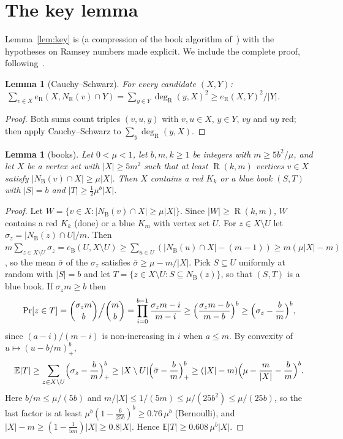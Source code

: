\documentclass[11pt]{article}
\newtheorem{lemma}[theorem]{Lemma}
\theoremstyle{definition}
\newcommand{\eR}{e_{\mathrm R}}
\newcommand{\NR}{N_{\mathrm R}}
\newcommand{\NB}{N_{\mathrm B}}
\DeclareMathOperator{\Ram}{R}
\begin{document}
\section{The key lemma}\label{sec:key}

Lemma~\ref{lem:key} is \cite[Lemma~12]{GNNW} (a compression of the book algorithm of~\cite{CGMS}) with the hypotheses on Ramsey numbers made explicit.  We include the complete proof, following~\cite{GNNW}.

\begin{lemma}[Cauchy--Schwarz]\label{lem:cs}
For every candidate $(X,Y)$: $\ \sum_{v\in X}\eR(X,\NR(v)\cap Y)=\sum_{y\in Y}\deg_{\mathrm R}(y,X)^2\ge\eR(X,Y)^2/|Y|$.
\end{lemma}
\begin{proof}
Both sums count triples $(v,u,y)$ with $v,u\in X$, $y\in Y$, $vy$ and $uy$ red; then apply Cauchy--Schwarz to $\sum_y\deg_{\mathrm R}(y,X)$.
\end{proof}

\begin{lemma}[books]\label{lem:book}
Let $0<\mu<1$, let $b,m,k\ge1$ be integers with $m\ge5b^2/\mu$, and let $X$ be a vertex set with $|X|\ge5m^2$ such that at least $\Ram(k,m)$ vertices $v\in X$ satisfy $|\NB(v)\cap X|\ge\mu|X|$.  Then $X$ contains a red $K_k$ or a blue book $(S,T)$ with $|S|=b$ and $|T|\ge\frac12\mu^b|X|$.
\end{lemma}
\begin{proof}
Let $W=\{v\in X:|\NB(v)\cap X|\ge\mu|X|\}$.  Since $|W|\ge\Ram(k,m)$, $W$ contains a red $K_k$ (done) or a blue $K_m$ with vertex set $U$.  For $z\in X\setminus U$ let $\sigma_z=|\NB(z)\cap U|/m$.  Then
$m\sum_{z\in X\setminus U}\sigma_z=e_{\mathrm B}(U,X\setminus U)\ge\sum_{u\in U}(|\NB(u)\cap X|-(m-1))\ge m(\mu|X|-m)$,
so the mean $\bar\sigma$ of the $\sigma_z$ satisfies $\bar\sigma\ge\mu-m/|X|$.  Pick $S\subseteq U$ uniformly at random with $|S|=b$ and let $T=\{z\in X\setminus U:S\subseteq\NB(z)\}$, so that $(S,T)$ is a blue book.  If $\sigma_zm\ge b$ then
\[
\Pr[z\in T]=\binom{\sigma_zm}{b}\Big/\binom mb=\prod_{i=0}^{b-1}\frac{\sigma_zm-i}{m-i}\ge\Bigl(\frac{\sigma_zm-b}{m-b}\Bigr)^b\ge\Bigl(\sigma_z-\frac bm\Bigr)^b,
\]
since $(a-i)/(m-i)$ is non-increasing in $i$ when $a\le m$.  By convexity of $u\mapsto(u-b/m)_+^b$,
\[
\mathbb E|T|\ge\sum_{z\in X\setminus U}\Bigl(\sigma_z-\frac bm\Bigr)_+^b\ge|X\setminus U|\Bigl(\bar\sigma-\frac bm\Bigr)_+^b\ge(|X|-m)\Bigl(\mu-\frac m{|X|}-\frac bm\Bigr)^b .
\]
Here $b/m\le\mu/(5b)$ and $m/|X|\le1/(5m)\le\mu/(25b^2)\le\mu/(25b)$, so the last factor is at least $\mu^b(1-\frac6{25b})^b\ge0.76\,\mu^b$ (Bernoulli), and $|X|-m\ge(1-\frac1{5m})|X|\ge0.8|X|$.  Hence $\mathbb E|T|\ge0.608\,\mu^b|X|$.
\end{proof}
\end{document}
